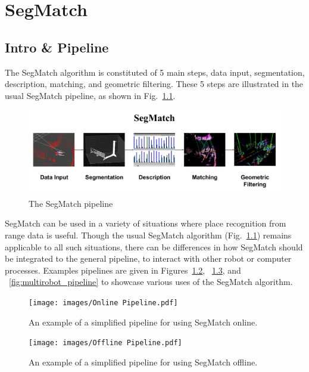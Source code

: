 \chapter{SegMatch}
\label{chap:segmatch}

\section{Intro \& Pipeline}
\label{sec:intro-pipeline}
The SegMatch algorithm is constituted of 5 main steps, data input, segmentation, description, matching, and geometric filtering. These 5 steps are illustrated in the usual SegMatch pipeline, as shown in Fig.~\ref{fig:pipeline}.\\

\begin{figure}
  \centering
  \includegraphics[width=5.2in]{images/pipeline.pdf}
  \caption{The SegMatch pipeline}
  \label{fig:pipeline}
\end{figure}

SegMatch can be used in a variety of situations where place recognition from range data is useful. Though the usual SegMatch algorithm (Fig.~\ref{fig:pipeline}) remains applicable to all such situations, there can be differences in how SegMatch should be integrated to the general pipeline, to interact with other robot or computer processes. Examples pipelines are given in Figures~\ref{fig:online_pipeline}, ~\ref{fig:offline_pipeline}, and ~\ref{fig:multirobot_pipeline} to showcase various uses of the SegMatch algorithm.

\begin{figure}
  \centering
  \texttt{[image: images/Online Pipeline.pdf]}
  \caption{An example of a simplified pipeline for using SegMatch online.}
  \label{fig:online_pipeline}
\end{figure}

\begin{figure}
  \centering
  \texttt{[image: images/Offline Pipeline.pdf]}
  \caption{An example of a simplified pipeline for using SegMatch offline.}
  \label{fig:offline_pipeline}
\end{figure}

